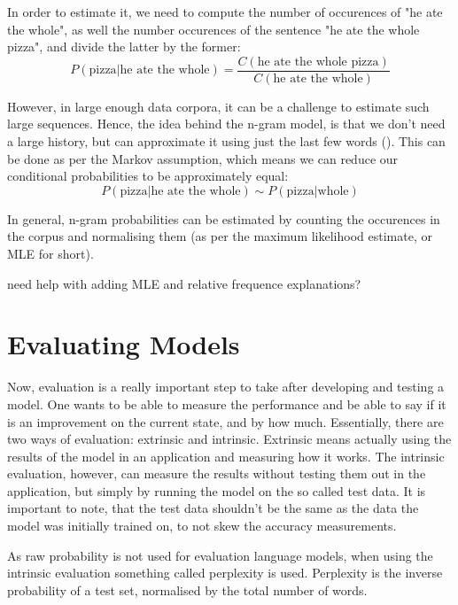 In order to estimate it, we need to compute the number of occurences of "he ate the whole", as well the number occurences of the sentence "he ate the whole pizza", and divide the latter by the former:
\begin{equation}
    P(\text{pizza}|\text{he ate the whole})=\frac{C(\text{he ate the whole pizza})}{C(\text{he ate the whole})}
\end{equation}

However, in large enough data corpora, it can be a challenge to estimate such large sequences. Hence, the idea behind the n-gram model, is that we don't need a large history, but can approximate it using just the last few words (\cite{Jura09a}). This can be done as per the Markov assumption, which means we can reduce our conditional probabilities to be approximately equal:
\begin{equation}
    P(\text{pizza}|\text{he ate the whole}) \sim P(\text{pizza}|\text{whole})
\end{equation}

In general, n-gram probabilities can be estimated by counting the occurences in the corpus and normalising them (as per the maximum likelihood estimate, or MLE for short).

need help with adding MLE and relative frequence explanations?

\section{Evaluating Models}
Now, evaluation is a really important step to take after developing and testing a model. One wants to be able to measure the performance and be able to say if it is an improvement on the current state, and by how much. Essentially, there are two ways of evaluation: extrinsic and intrinsic. Extrinsic means actually using the results of the model in an application and measuring how it works. The intrinsic evaluation, however, can measure the results without testing them out in the application, but simply by running the model on the so called test data. It is important to note, that the test data shouldn't be the same as the data the model was initially trained on, to not skew the accuracy measurements.

As raw probability is not used for evaluation language models, when using the intrinsic evaluation something called perplexity is used. Perplexity is the inverse probability of a test set, normalised by the total number of words.


